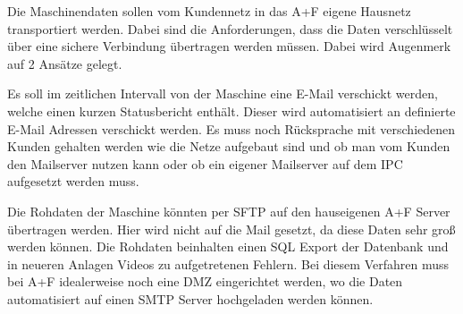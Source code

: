 Die Maschinendaten sollen vom Kundennetz in das A+F eigene Hausnetz transportiert werden. Dabei sind die Anforderungen, dass die Daten verschlüsselt über eine sichere Verbindung übertragen werden müssen. 
Dabei wird Augenmerk auf 2 Ansätze gelegt.

Es soll im zeitlichen Intervall von der Maschine eine E-Mail verschickt werden, welche einen kurzen Statusbericht enthält. Dieser wird automatisiert an definierte E-Mail Adressen verschickt werden. Es muss noch Rücksprache mit verschiedenen Kunden gehalten werden wie die Netze aufgebaut sind und ob man vom Kunden den Mailserver nutzen kann oder ob ein eigener Mailserver auf dem \ac{IPC} aufgesetzt werden muss.

Die Rohdaten der Maschine könnten per SFTP auf den hauseigenen A+F Server übertragen werden. Hier wird nicht auf die Mail gesetzt, da diese Daten sehr groß werden können. Die Rohdaten beinhalten einen SQL Export der Datenbank und in neueren Anlagen Videos zu aufgetretenen Fehlern. Bei diesem Verfahren muss bei A+F idealerweise noch eine DMZ eingerichtet werden, wo die Daten automatisiert auf einen SMTP Server hochgeladen werden können.
